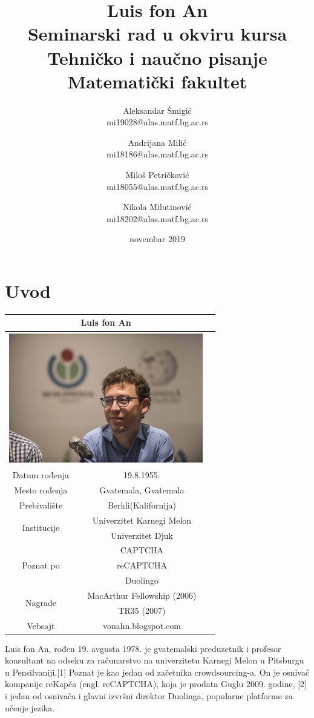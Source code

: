 \documentclass[titlepage, 12pt]{article}
\title{Luis fon An\\ \small{Seminarski rad u okviru kursa\\Tehničko i naučno pisanje\\ Matematički fakultet}}
\author{Aleksandar Šmigić \\ mi19028@alas.matf.bg.ac.rs \and Andrijana Milić \\ mi18186@alas.matf.bg.ac.rs \and Miloš Petričković \\ mi18055@alas.matf.bg.ac.rs \and Nikola Milutinović \\ mi18202@alas.matf.bg.ac.rs}
\date{novembar 2019}
\begin{document}
\maketitle

\tableofcontents
\newpage
\section{Uvod}

{\renewcommand{\arraystretch}{1.2}}
\begin{tabular}{|c|c|c|}
\hline
\multicolumn{2}{|c|}{\Large{Luis fon An}}\\[4px]
\hline
\multicolumn{2}{|c|}{\includegraphics[width=320px,height=216px]{Luis_von_Ahn.jpg}}\\

\hline
Datum rođenja & 19.8.1955. \\
\hline
Mesto rođenja & Gvatemala, Gvatemala\\
\hline
Prebivalište & Berkli(Kalifornija)\\
\hline
\multirow{2}{*}{Institucije}&Univerzitet Karnegi Melon\\
& Univerzitet Djuk \\
\hline 
\multirow{3}{*}{Poznat po} & CAPTCHA \\
& reCAPTCHA \\ & Duolingo \\
\hline
\multirow{2}{*}{Nagrade} & MacArthur Fellowship (2006) \\
 & TR35 (2007)
\\
\hline
Vebsajt & vonahn.blogspot.com \\
\hline
\end{tabular}

\vspace{20px}

Luis fon An, rođen 19. avgusta 1978. je gvatemalski preduzetnik i profesor konsultant na odseku za računarstvo na univerzitetu Karnegi Melon u Pitsburgu u Pensilvaniji.[1] Poznat je kao jedan od začetnika crowdsourcing-a. On je osnivač kompanije reKapča (engl. reCAPTCHA), koja je prodata Guglu 2009. godine, [2] i jedan od osnivača i glavni izvršni direktor Duolinga, popularne platforme za učenje jezika. 
\end{document}
